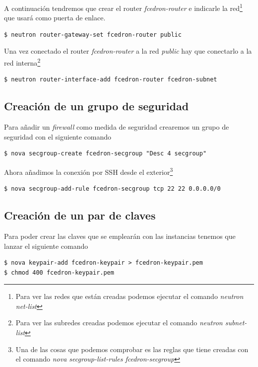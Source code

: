 \documentclass{article}
\begin{document}
	A continuación tendremos que crear el router \emph{fcedron-router} e indicarle la red\footnote{
Para ver las redes que están creadas podemos ejecutar el comando \emph{neutron net-list}	
} que usará como puerta de enlace.
\begin{lstlisting}[style=miniBash]
$ neutron router-gateway-set fcedron-router public
\end{lstlisting}

	Una vez conectado el router \emph{fcedron-router} a la red \emph{public} hay que conectarlo a la red interna\footnote{
Para ver las subredes creadas podemos ejecutar el comando \emph{neutron subnet-list}}
\begin{lstlisting}[style=miniBash]
$ neutron router-interface-add fcedron-router fcedron-subnet
\end{lstlisting}

\subsection{Creación de un grupo de seguridad}
	Para añadir un \emph{firewall} como medida de seguridad crearemos un grupo de seguridad con el siguiente comando\cite{ComputeCLIOpenStack}
\begin{lstlisting}[style=miniBash]
$ nova secgroup-create fcedron-secgroup "Desc 4 secgroup"
\end{lstlisting}

	Ahora añadimos la conexión por SSH desde el exterior\footnote{
Una de las cosas que podemos comprobar es las reglas que tiene creadas con el comando \emph{nova secgroup-list-rules fcedron-secgroup}
}
\begin{lstlisting}[style=miniBash]
$ nova secgroup-add-rule fcedron-secgroup tcp 22 22 0.0.0.0/0
\end{lstlisting}

\subsection{Creación de un par de claves}
	Para poder crear las claves que se emplearán con las instancias tenemos que lanzar el siguiente comando
\begin{lstlisting}[style=miniBash]
$ nova keypair-add fcedron-keypair > fcedron-keypair.pem
$ chmod 400 fcedron-keypair.pem
\end{lstlisting}
\end{document}

